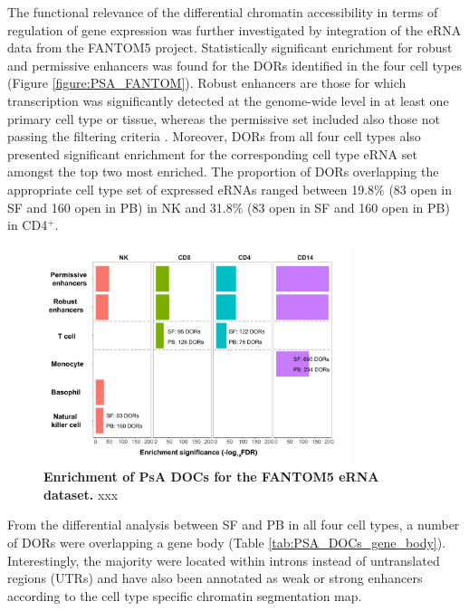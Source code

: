 The functional relevance of the differential chromatin accessibility in terms of regulation of gene expression was further investigated by integration of the eRNA data from the FANTOM5 project. Statistically significant enrichment for robust and permissive enhancers was found for the DORs identified in the four cell types (Figure \ref{figure:PSA_FANTOM}). Robust enhancers are those for which transcription was significantly detected at the genome-wide level in at least one primary cell type or tissue, whereas the permissive set included also those not passing the filtering criteria \parencite{Andersson2014}. Moreover, DORs from all four cell types also presented significant enrichment for the corresponding cell type eRNA set amongst the top two most enriched. The proportion of DORs overlapping the appropriate cell type set of expressed eRNAs ranged between 19.8\% (83 open in SF and 160 open in PB) in NK and 31.8\% (83 open in SF and 160 open in PB) in CD4$^+$.


\begin{figure}[htbp]
\centering
\includegraphics[width=0.8\textwidth]{./Results3/pdfs/ATAC_PsA_FANTOM_enhancer_enrichment_all_cell_types}
\caption[Enrichment of PsA DORs for the FANTOM5 eRNA dataset.]{\textbf{Enrichment of PsA DOCs for the FANTOM5 eRNA dataset.} xxx }
\label{fig:PSA_FANTOM}
\end{figure}

From the differential analysis between SF and PB in all four cell types, a number of DORs were overlapping a gene body (Table \ref{tab:PSA_DOCs_gene_body}). Interestingly, the majority were located within introns instead of untranslated regions (UTRs) and have also been annotated as weak or strong enhancers according to the cell type specific chromatin segmentation map. 

